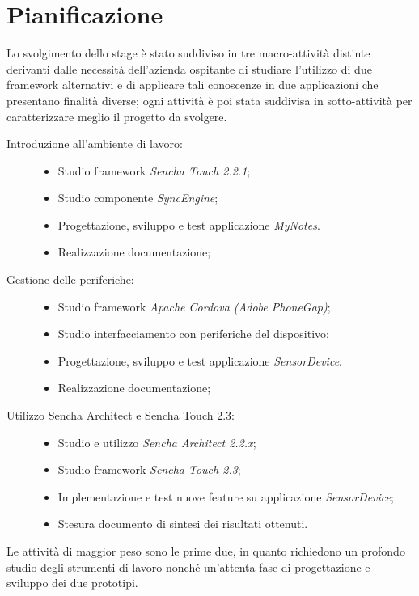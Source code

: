\chapter{Pianificazione}\label{ch:pianificazione}
Lo svolgimento dello stage è stato suddiviso in tre macro-attività distinte derivanti dalle necessità dell'azienda ospitante di studiare l'utilizzo di due framework alternativi e di applicare tali conoscenze in due applicazioni che presentano finalità diverse; ogni attività è poi stata suddivisa in sotto-attività per caratterizzare meglio il progetto da svolgere.
\begin{description}
\item[Introduzione all'ambiente di lavoro:] \hfill
	\begin{itemize}
	\item Studio framework \emph{Sencha Touch 2.2.1};
	\item Studio componente \emph{SyncEngine};
	\item Progettazione, sviluppo e test applicazione \emph{MyNotes}.
	\item Realizzazione documentazione;
	\end{itemize}
\item[Gestione delle periferiche:] \hfill
	\begin{itemize}
	\item Studio framework \emph{Apache Cordova (Adobe PhoneGap)};
	\item Studio interfacciamento con periferiche del dispositivo;
	\item Progettazione, sviluppo e test applicazione \emph{SensorDevice}.
	\item Realizzazione documentazione;
	\end{itemize}
\item[Utilizzo Sencha Architect e Sencha Touch 2.3:] \hfill
	\begin{itemize}
	\item Studio e utilizzo \emph{Sencha Architect 2.2.x};
	\item Studio framework \emph{Sencha Touch 2.3};
	\item Implementazione e test nuove feature su applicazione \emph{SensorDevice};
	\item Stesura documento di sintesi dei risultati ottenuti.
	\end{itemize}
\end{description}
Le attività di maggior peso sono le prime due, in quanto richiedono un profondo studio degli strumenti di lavoro nonché un'attenta fase di progettazione e sviluppo dei due prototipi.

